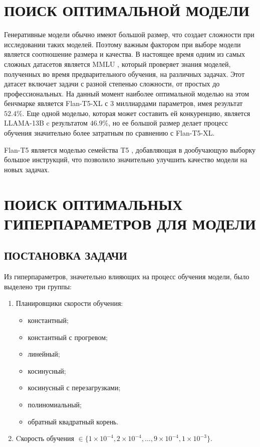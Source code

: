\section{ПОИСК ОПТИМАЛЬНОЙ МОДЕЛИ}

Генеративные модели обычно имеют большой размер, что создает сложности при исследовании таких моделей. Поэтому важным фактором при выборе модели является соотношение размера и качества. В настоящее время одним из самых сложных датасетов является MMLU \cite{bib1}, который проверяет знания моделей, полученных во время предварительного обучения, на различных задачах. Этот датасет включает задачи с разной степенью сложности, от простых до профессиональных. На данный момент наиболее оптимальной моделью на этом бенчмарке является Flan-T5-XL \cite{bib2} с 3 миллиардами параметров, имея результат $52.4\%$. Еще одной моделью, которая может составить ей конкуренцию, является LLAMA-13B \cite{bib3} c результатом $46.9\%$, но ее большой размер делает процесс обучения значительно более затратным по сравнению с Flan-T5-XL.

Flan-T5 является моделью семейства T5 \cite{bib4}, добавляющая в дообучающую выборку большое инструкций, что позволило значительно улучшить качество модели на новых задачах.

\section{ПОИСК ОПТИМАЛЬНЫХ ГИПЕРПАРАМЕТРОВ ДЛЯ МОДЕЛИ}
\subsection{ПОСТАНОВКА ЗАДАЧИ}

Из гиперпараметров, значетельно влияющих на процесс обучения модели, было выделено три группы:
\begin{enumerate}
  \item Планировщики скорости обучения:
        \begin{itemize}
          \item константный;
          \item константный с прогревом;
          \item линейный;
          \item косинусный;
          \item косинусный с перезагрузками;
          \item полиномиальный;
          \item обратный квадратный корень.
        \end{itemize}
  \item Cкорость обучения $\in \{1 \times 10^{-4}, 2 \times 10^{-4}, \ldots, 9 \times 10^{-4}, 1 \times 10^{-3}\}$.
\end{enumerate}

